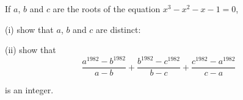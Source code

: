 If $a$,  $b$ and $c$ are the roots of the equation $x^3 - x^2 - x - 1 = 0$, 

(i) show that $a$,  $b$ and $c$ are distinct:

(ii) show that\[\frac{a^{1982} - b^{1982}}{a - b} + \frac{b^{1982} - c^{1982}}{b - c} + \frac{c^{1982} - a^{1982}}{c - a}\]

is an integer.